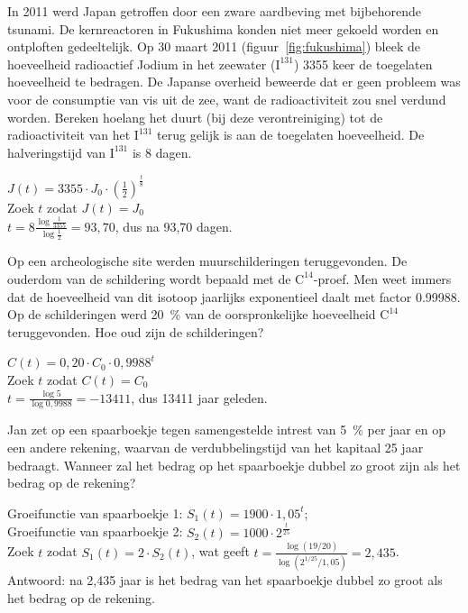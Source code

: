 \begin{oef}
In 2011 werd Japan getroffen door een zware aardbeving met bijbehorende tsunami. De kernreactoren in Fukushima konden niet meer gekoeld worden en ontploften gedeeltelijk. Op 30 maart 2011 (figuur~\ref{fig:fukushima}) bleek de hoeveelheid radioactief Jodium in het zeewater ($\text{I}^{131}$) 3355 keer de toegelaten hoeveelheid te bedragen. 
De Japanse overheid beweerde dat er geen probleem was voor de consumptie van vis uit de zee, want de radioactiviteit zou snel verdund worden. Bereken hoelang het duurt (bij deze verontreiniging) tot de radioactiviteit van het $\text{I}^{131}$ terug gelijk is aan de toegelaten hoeveelheid. De halveringstijd van $\text{I}^{131}$ is 8 dagen.
\begin{opl}
$J(t)=3355\cdot J_0\cdot \left( \frac12\right)^\frac{t}{8}$\\
Zoek $t$ zodat $J(t)=J_0$\\
$t=8\frac{\log \frac{1}{3355}}{\log\frac12}=93,70$, dus na 93,70 dagen.
\end{opl}
\end{oef}


\begin{oef}
Op een archeologische site werden muurschilderingen
teruggevonden. De ouderdom van de schildering wordt bepaald
met de $\text{C}^{14}$-proef.  Men weet immers  dat de
hoeveelheid van dit isotoop jaarlijks exponentieel daalt met factor
\num{0.99988}. Op de schilderingen werd \SI{20}{\percent} van de
oorspronkelijke hoeveelheid $\text{C}^{14}$ teruggevonden. Hoe oud
zijn de schilderingen?
\begin{opl}
  $C(t)=0,20\cdot C_0\cdot 0,9988^t$\\
  Zoek $t$ zodat $C(t)=C_0$\\
  $t=\frac{\log5}{\log0,9988}=-13411$, dus 13411 jaar geleden.
\end{opl}
\end{oef}

\begin{oef}
  Jan zet  op een spaarboekje tegen samengestelde
      intrest van \SI{5}{\percent} per jaar en  op een andere rekening,
      waarvan de verdubbelingstijd van het kapitaal 25 jaar bedraagt.
      Wanneer zal het bedrag op het spaarboekje dubbel zo
      groot zijn als het bedrag op de rekening?
\begin{opl}
Groeifunctie van spaarboekje 1: $S_1(t)=1900\cdot 1,05^t$; \\Groeifunctie van spaarboekje 2: $S_2(t)=1000\cdot 2^\frac{t}{25}$\\
Zoek $t$ zodat $S_1(t)=2\cdot S_2(t)$, wat geeft $t=\frac{\log(19/20)}{\log(2^{1/25}/1,05)}=2,435$.\\
Antwoord: na 2,435 jaar is het bedrag van het spaarboekje dubbel zo groot als het bedrag op de rekening.
\end{opl}
\end{oef}



